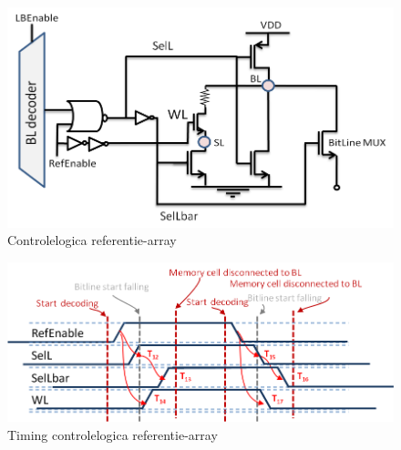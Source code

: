 \begin{figure}[!ht]
  \centering
  \includegraphics[scale=0.6]{../fig/hfdstk-timing-lbref1.png}
  \caption[Referentie-array:logica]{Controlelogica referentie-array}
  \label{fig:lbref_timing1}
\end{figure}

\begin{figure}[!ht]
  \centering
  \includegraphics[scale=0.9]{../fig/hfdstk-timing-lbref2.png}
  \caption[Referentie-array:timing]{Timing controlelogica referentie-array}
  \label{fig:lbref_timing2}
\end{figure}

